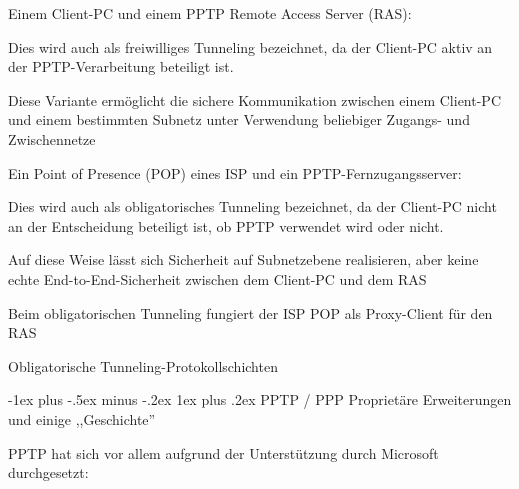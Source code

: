 \documentclass[a4paper]{article}
\makeatletter
\renewcommand{\subsubsection}{\@startsection{subsubsection}{3}{0mm}%
 {-1ex plus -.5ex minus -.2ex}%
 {1ex plus .2ex}%
 {\normalfont\small\bfseries}}
\makeatother
\begin{document}
\begin{multicols}{3}
\begin{itemize*}
            \begin{itemize*}
                  \item Einem Client-PC und einem PPTP Remote Access Server (RAS):
                  \begin{itemize*} \item Dies wird auch als freiwilliges Tunneling bezeichnet, da der Client-PC aktiv an der PPTP-Verarbeitung beteiligt ist. \item Diese Variante ermöglicht die sichere Kommunikation zwischen einem Client-PC und einem bestimmten Subnetz unter Verwendung beliebiger Zugangs- und Zwischennetze \end{itemize*}
                  \item Ein Point of Presence (POP) eines ISP und ein PPTP-Fernzugangsserver:
                  \begin{itemize*} \item Dies wird auch als obligatorisches Tunneling bezeichnet, da der Client-PC nicht an der Entscheidung beteiligt ist, ob PPTP verwendet wird oder nicht. \item Auf diese Weise lässt sich Sicherheit auf Subnetzebene realisieren, aber keine echte End-to-End-Sicherheit zwischen dem Client-PC und dem RAS \item Beim obligatorischen Tunneling fungiert der ISP POP als Proxy-Client für den RAS \end{itemize*}
            \end{itemize*}
      \end{itemize*}

      Obligatorische Tunneling-Protokollschichten



      \subsubsection{PPTP / PPP Proprietäre Erweiterungen und einige
            ,,Geschichte''}

      \begin{itemize*}
            \item
            PPTP hat sich vor allem aufgrund der Unterstützung durch Microsoft
            durchgesetzt:


\end{itemize*}
\end{multicols}
\end{document}
